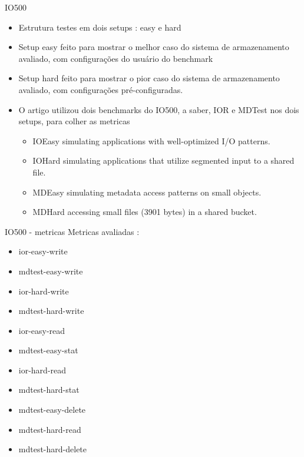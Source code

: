 \documentclass{beamer}
\begin{document}
\begin{frame}{IO500}
	\begin{itemize}
		\item Estrutura testes em dois setups : easy e hard
		\item Setup easy feito para mostrar o melhor caso do sistema de armazenamento avaliado, com configurações do usuário do benchmark
		\item Setup hard feito para mostrar o pior caso do sistema de armazenamento avaliado, com configurações pré-configuradas.
		\item O artigo utilizou dois benchmarks do IO500, a saber, IOR e MDTest nos dois setups, para colher as metricas
		\begin{itemize}
			\item IOEasy simulating applications with well-optimized I/O patterns.
			\item IOHard simulating applications that utilize segmented input to a shared file.
			\item MDEasy simulating metadata access patterns on small objects.
			\item MDHard accessing small files (3901 bytes) in a shared bucket.
		\end{itemize}
		\end{itemize}
	\end{frame}
\begin{frame}{IO500 - metricas}
	Metricas avaliadas : 
		\begin{itemize}
			\item ior-easy-write
			\item mdtest-easy-write
			\item ior-hard-write
			\item mdtest-hard-write
			\item ior-easy-read
			\item mdtest-easy-stat
			\item ior-hard-read
			\item mdtest-hard-stat
			\item mdtest-easy-delete
			\item mdtest-hard-read
			\item mdtest-hard-delete
		\end{itemize}

\end{frame}
\end{document}
